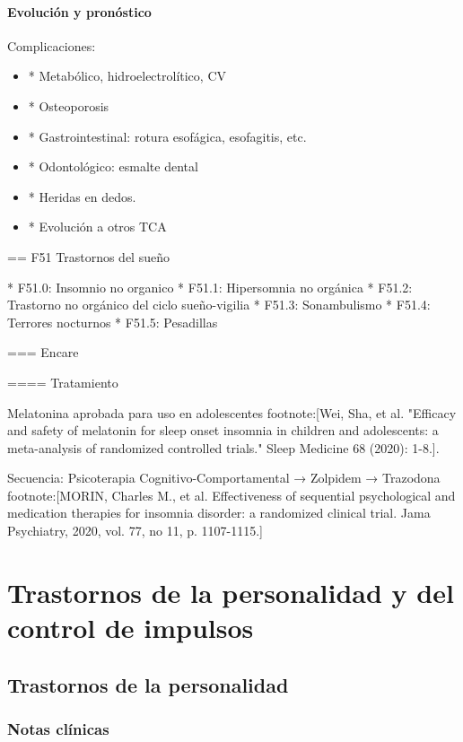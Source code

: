 \documentclass{scrbook}
\begin{document}
\subsection*{Evolución y pronóstico}
Complicaciones:
\begin{itemize}
	\item * Metabólico, hidroelectrolítico, CV
	\item * Osteoporosis
	\item * Gastrointestinal: rotura esofágica, esofagitis, etc.
	\item * Odontológico: esmalte dental
	\item * Heridas en dedos.
	\item * Evolución a otros TCA
\end{itemize}
\printbibliography

== F51 Trastornos del sueño

* F51.0: Insomnio no organico
* F51.1: Hipersomnia no orgánica
* F51.2: Trastorno no orgánico del ciclo sueño-vigilia
* F51.3: Sonambulismo
* F51.4: Terrores nocturnos
* F51.5: Pesadillas

=== Encare

==== Tratamiento

Melatonina aprobada para uso en adolescentes footnote:[Wei, Sha, et al. "Efficacy and safety of melatonin for sleep onset insomnia in children and adolescents: a meta-analysis of randomized controlled trials." Sleep Medicine 68 (2020): 1-8.].


Secuencia: Psicoterapia Cognitivo-Comportamental → Zolpidem → Trazodona footnote:[MORIN, Charles M., et al. Effectiveness of sequential psychological and medication therapies for insomnia disorder: a randomized clinical trial. Jama Psychiatry, 2020, vol. 77, no 11, p. 1107-1115.]

\part{Trastornos de la personalidad y del control de impulsos}
\chapter{Trastornos de la personalidad}
\section*{Notas clínicas}
\end{document}
